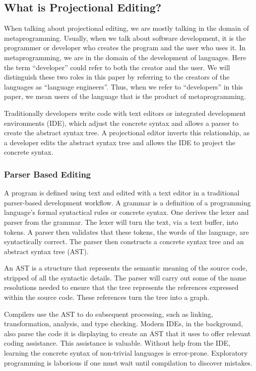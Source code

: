 \subsection{What is Projectional Editing?}
\label{section:WhatIsPE}

When talking about projectional editing, we are mostly talking in the domain of metaprogramming.
Usually, when we talk about software development, it is the programmer or developer who creates the program and the user who uses it. 
In metaprogramming, we are in the domain of the development of languages.
Here the term ``developer'' could refer to both the creator and the user.
We will distinguish these two roles in this paper by referring to the creators of the languages as ``language engineers''.
Thus, when we refer to ``developers'' in this paper, we mean users of the language that is the product of metaprogramming. 

Traditionally developers write code with text editors or integrated development environments (IDE), which adjust the concrete syntax and allows a parser to create the abstract syntax tree.
A projectional editor inverts this relationship, as a developer edits the abstract syntax tree and allows the IDE to project the concrete syntax.

\subsubsection{Parser Based Editing}

A program is defined using text and edited with a text editor in a traditional parser-based development workflow.
A grammar is a definition of a programming language's formal syntactical rules or concrete syntax.
One derives the lexer and parser from the grammar.
The lexer will turn the text, via a text buffer, into tokens. 
A parser then validates that these tokens, the words of the language, are syntactically correct.
The parser then constructs a concrete syntax tree and an abstract syntax tree (AST).

An AST is a structure that represents the semantic meaning of the source code, stripped of all the syntactic details.
The parser will carry out some of the name resolutions needed to ensure that the tree represents the references expressed within the source code.
These references turn the tree into a graph.

Compilers use the AST to do subsequent processing, such as linking, transformation, analysis, and type checking.
Modern IDEs, in the background, also parse the code it is displaying to create an AST that it uses to offer relevant coding assistance.
This assistance is valuable.
Without help from the IDE, learning the concrete syntax of non-trivial languages is error-prone.
Exploratory programming is laborious if one must wait until compilation to discover mistakes.

